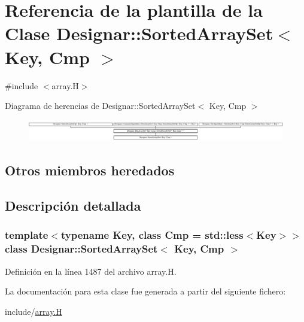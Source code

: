 \hypertarget{class_designar_1_1_sorted_array_set}{}\section{Referencia de la plantilla de la Clase Designar\+:\+:Sorted\+Array\+Set$<$ Key, Cmp $>$}
\label{class_designar_1_1_sorted_array_set}


{\ttfamily \#include $<$array.\+H$>$}

Diagrama de herencias de Designar\+:\+:Sorted\+Array\+Set$<$ Key, Cmp $>$\begin{figure}[H]
\begin{center}
\leavevmode
\includegraphics[height=0.942761cm]{class_designar_1_1_sorted_array_set}
\end{center}
\end{figure}
\subsection*{Otros miembros heredados}


\subsection{Descripción detallada}
\subsubsection*{template$<$typename Key, class Cmp = std\+::less$<$\+Key$>$$>$\newline
class Designar\+::\+Sorted\+Array\+Set$<$ Key, Cmp $>$}



Definición en la línea 1487 del archivo array.\+H.



La documentación para esta clase fue generada a partir del siguiente fichero\+:\begin{DoxyCompactItemize}
\item 
include/\hyperlink{array_8_h}{array.\+H}\end{DoxyCompactItemize}
